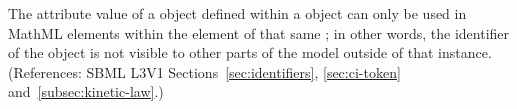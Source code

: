 The  attribute value of a \LocalParameter object defined within a
\KineticLaw object can only be used in MathML  elements within
the  element of that same \KineticLaw; in other words, the
identifier of the \LocalParameter object is not visible to other parts of
the model outside of that \KineticLaw instance.  (References: SBML L3V1
Sections~\ref{sec:identifiers}, \ref{sec:ci-token}
and~\ref{subsec:kinetic-law}.)
